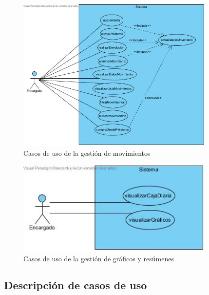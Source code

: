 \begin{figure}[H]
	\centering
	\includegraphics[width=0.88\textwidth]{imagenes/imagenesDiagramas/useCases/useCaseMovimiento.jpg}
	\caption{Casos de uso de la gestión de movimientos}
	\label{fig:usecaseMovimientos}
\end{figure}

\begin{figure}[H]
	\centering
	\includegraphics[width=0.88\textwidth]{imagenes/imagenesDiagramas/useCases/useCaseGraficos.jpg}
	\caption{Casos de uso de la gestión de gráficos y resúmenes}
	\label{fig:usecaseGraficos}
\end{figure}

\newpage

\subsection{Descripción de casos de uso}



